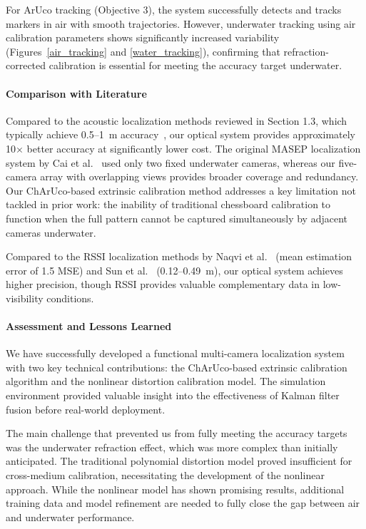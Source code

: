 \documentclass[11pt]{article}
\begin{document}
        For ArUco tracking (Objective 3), the system successfully detects and tracks markers in air with smooth trajectories. However, underwater tracking using air calibration parameters shows significantly increased variability (Figures~\ref{air_tracking} and \ref{water_tracking}), confirming that refraction-corrected calibration is essential for meeting the accuracy target underwater.

        \paragraph{Comparison with Literature}
        Compared to the acoustic localization methods reviewed in Section 1.3, which typically achieve 0.5--1~m accuracy~\cite{mceachern_real-time_2024, bosser_broadband_2024}, our optical system provides approximately 10$\times$ better accuracy at significantly lower cost. The original MASEP localization system by Cai et al.~\cite{cai_development_2024} used only two fixed underwater cameras, whereas our five-camera array with overlapping views provides broader coverage and redundancy. Our ChArUco-based extrinsic calibration method addresses a key limitation not tackled in prior work: the inability of traditional chessboard calibration to function when the full pattern cannot be captured simultaneously by adjacent cameras underwater.

        Compared to the RSSI localization methods by Naqvi et al.~\cite{naqvi2025rssi} (mean estimation error of 1.5 MSE) and Sun et al.~\cite{sun2019mobile} (0.12--0.49~m), our optical system achieves higher precision, though RSSI provides valuable complementary data in low-visibility conditions.

        \paragraph{Assessment and Lessons Learned}
        We have successfully developed a functional multi-camera localization system with two key technical contributions: the ChArUco-based extrinsic calibration algorithm and the nonlinear distortion calibration model. The simulation environment provided valuable insight into the effectiveness of Kalman filter fusion before real-world deployment.

        The main challenge that prevented us from fully meeting the accuracy targets was the underwater refraction effect, which was more complex than initially anticipated. The traditional polynomial distortion model proved insufficient for cross-medium calibration, necessitating the development of the nonlinear approach. While the nonlinear model has shown promising results, additional training data and model refinement are needed to fully close the gap between air and underwater performance.
\end{document}
